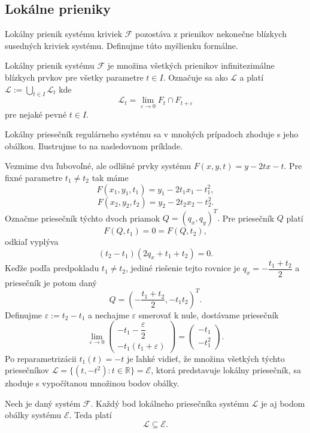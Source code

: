 \subsection{Lokálne prieniky} \label{lokalne prieniky pre krivky}
Lokálny prienik systému kriviek $\mathcal{F} $ pozostáva z prienikov nekonečne blízkych susedných kriviek systému. Definujme túto myšlienku formálne.
\begin{definition} \label{def:lokalny prienik}
Lokálny prienik systému $\mathcal{F}$ je množina všetkých prienikov infinitezimálne blízkych prvkov pre všetky parametre $t \in I$. Označuje sa ako $\mathcal{L}$ a platí
$
\mathcal{L} := \bigcup_{t \in I} \mathcal{L}_{t}
$ kde
$$
\mathcal{L}_{t} = \lim_{\varepsilon \to 0} F_{t} \cap F_{t + \varepsilon}
$$
pre nejaké pevné $t \in I.$
\end{definition}
Lokálny priesečník regulárneho systému sa v mnohých prípadoch zhoduje s jeho obálkou. Ilustrujme to na nasledovnom príklade.

\begin{example}
Vezmime dva ľubovoľné, ale odlišné prvky systému $F(x, y, t) = y - 2tx - t.$
Pre fixné parametre $t_1 \neq t_2$ tak máme
$$F(x_1, y_1, t_1) = y_1 - 2t_1x_1 - t_1^2,$$
$$F(x_2, y_2, t_2) = y_2 - 2t_2x_2 - t_2^2.$$ 
Označme priesečník týchto dvoch priamok $Q = (q_x, q_y)^T.$ Pre priesečník $Q$ platí $$F(Q, t_1) = 0 = F(Q, t_2),$$ odkiaľ vyplýva 
$$(t_2 - t_1)(2q_x + t_1 + t_2) = 0.$$ 
Keďže podľa predpokladu $t_1 \neq t_2$, jediné riešenie tejto rovnice je $q_x = -\dfrac{t_1 + t_2}{2}$ a priesečník je potom daný 
$$Q = (-\dfrac{t_1 + t_2}{2}, -t_1t_2)^T.$$ Definujme $\varepsilon := t_2 - t_1$ a nechajme $\varepsilon$ smerovať k nule, dostávame priesečník
$$
\lim_{\varepsilon \to 0} 
\begin{pmatrix} 
-t_1 - \dfrac{\varepsilon}{2} \\
-t_1(t_1 + \varepsilon)
\end{pmatrix} = \begin{pmatrix} 
-t_1 \\
-t_1^2
\end{pmatrix}.
$$
Po reparametrizácii $t_1(t) = -t$ je ľahké vidieť, že množina všetkých týchto priesečníkov $\mathcal{L} = \{(t, -t^2): t \in \mathbb{R}\} = \mathcal{E}$, ktorá predstavuje lokálny priesečník, sa zhoduje s vypočítanou množinou bodov obálky.
\end{example}

\begin{corollary} Nech je daný systém $\mathcal{F}$. Každý bod lokálneho priesečníka systému $\mathcal{L}$ je aj bodom obálky systému $\mathcal{E}$. Teda platí
$$ \mathcal{L} \subseteq \mathcal{E}. $$
\end{corollary}

